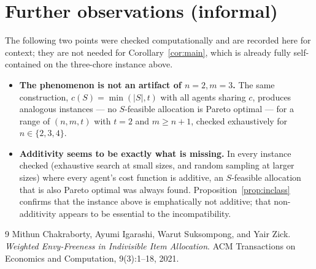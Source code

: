 \documentclass[11pt]{article}
\begin{document}
\section{Further observations (informal)}
\label{sec:further}

The following two points were checked computationally and are recorded here
for context; they are not needed for Corollary~\ref{cor:main}, which is
already fully self-contained on the three-chore instance above.

\begin{itemize}[leftmargin=1.4em]
  \item \textbf{The phenomenon is not an artifact of $n=2,m=3$.} The same
        construction, $c(S) = \min(|S|,t)$ with all agents sharing $c$,
        produces analogous instances --- no $S$-feasible allocation is
        Pareto optimal --- for a range of $(n,m,t)$ with $t=2$ and
        $m \ge n+1$, checked exhaustively for $n \in \{2,3,4\}$.
  \item \textbf{Additivity seems to be exactly what is missing.} In every
        instance checked (exhaustive search at small sizes, and random
        sampling at larger sizes) where every agent's cost function is
        additive, an $S$-feasible allocation that is also Pareto optimal was
        always found. Proposition~\ref{prop:inclass} confirms that the
        instance above is emphatically not additive; that non-additivity
        appears to be essential to the incompatibility.
\end{itemize}

\begin{thebibliography}{9}
Mithun Chakraborty, Ayumi Igarashi, Warut Suksompong, and Yair Zick.
\emph{Weighted Envy-Freeness in Indivisible Item Allocation}.
ACM Transactions on Economics and Computation, 9(3):1--18, 2021.
\end{thebibliography}
\end{document}
